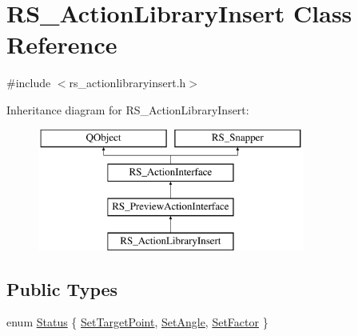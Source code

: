 \hypertarget{classRS__ActionLibraryInsert}{\section{R\-S\-\_\-\-Action\-Library\-Insert Class Reference}
\label{classRS__ActionLibraryInsert}
}


{\ttfamily \#include $<$rs\-\_\-actionlibraryinsert.\-h$>$}

Inheritance diagram for R\-S\-\_\-\-Action\-Library\-Insert\-:\begin{figure}[H]
\begin{center}
\leavevmode
\includegraphics[height=4.000000cm]{classRS__ActionLibraryInsert}
\end{center}
\end{figure}
\subsection*{Public Types}
\begin{DoxyCompactItemize}
\item 
enum \hyperlink{classRS__ActionLibraryInsert_a07bcc0d56f8cbdad359606f8af309ae7}{Status} \{ \hyperlink{classRS__ActionLibraryInsert_a07bcc0d56f8cbdad359606f8af309ae7a8048a475aa40fb6b68271c478ced8542}{Set\-Target\-Point}, 
\hyperlink{classRS__ActionLibraryInsert_a07bcc0d56f8cbdad359606f8af309ae7af8c6102fe82c8c7e3edd18005752851a}{Set\-Angle}, 
\hyperlink{classRS__ActionLibraryInsert_a07bcc0d56f8cbdad359606f8af309ae7aa0937e48ee179fd9a3dedf1943002bd7}{Set\-Factor}
 \}
\end{DoxyCompactItemize}
